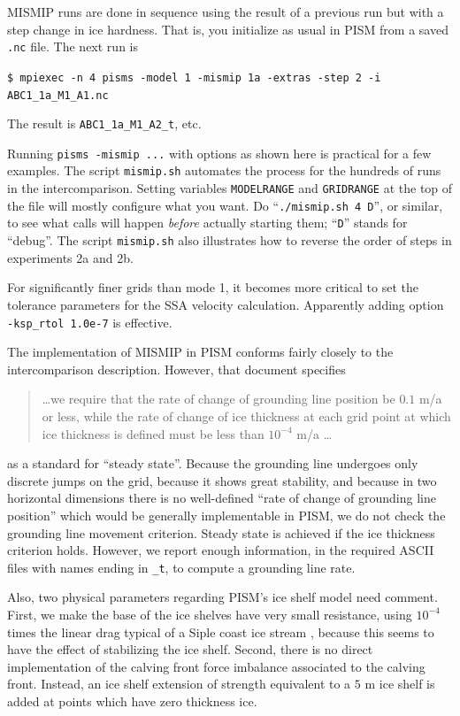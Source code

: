 \documentclass[11pt,final]{amsart}
\begin{document}
MISMIP runs are done in sequence using the result of a previous run but with a step change in ice hardness.  That is, you initialize as usual in PISM from a saved \verb|.nc| file.  The next run is

\verb|$ mpiexec -n 4 pisms -model 1 -mismip 1a -extras -step 2 -i ABC1_1a_M1_A1.nc|

\noindent The result is \verb|ABC1_1a_M1_A2_t|, etc.

Running \verb|pisms -mismip ...| with options as shown here is practical for a few examples.  The script \verb|mismip.sh| automates the process for the hundreds of runs in the intercomparison.  Setting variables \verb|MODELRANGE| and \verb|GRIDRANGE| at the top of the file will mostly configure what you want.  Do ``\verb|./mismip.sh 4 D|'', or similar, to see what calls will happen \emph{before} actually starting them; ``\verb|D|'' stands for ``debug''.  The script \verb|mismip.sh| also illustrates how to reverse the order of steps in experiments 2a and 2b.

For significantly finer grids than mode 1, it becomes more critical to set the tolerance parameters for the SSA velocity calculation.  Apparently adding option \verb|-ksp_rtol 1.0e-7| is effective.

The implementation of MISMIP in PISM conforms fairly closely to the intercomparison description.  However, that document specifies
\begin{quotation}
\dots we require that the rate of change of grounding line position be $0.1$ m/a or less, while the rate of change of ice thickness at each grid point at which ice thickness is defined must be less than $10^{-4}$ m/a \dots
\end{quotation}
as a standard for ``steady state''.  Because the grounding line undergoes only discrete jumps on the grid, because it shows great stability, and because in two horizontal dimensions there is no well-defined ``rate of change of grounding line position'' which would be generally implementable in PISM, we do not check the grounding line movement criterion.  Steady state is achieved if the ice thickness criterion holds.  However, we report enough information, in the required ASCII files with names ending in \verb|_t|, to compute a grounding line rate.

Also, two physical parameters regarding PISM's ice shelf model need comment.  First, we make the base of the ice shelves have very small resistance, using $10^{-4}$ times the linear drag typical of a Siple coast ice stream \cite{HulbeMacAyeal}, because this seems to have the effect of stabilizing the ice shelf.  Second, there is no direct implementation of the calving front force imbalance associated to the calving front.  Instead, an ice shelf extension of strength equivalent to a $5$ m ice shelf is added at points which have zero thickness ice.
\end{document}
